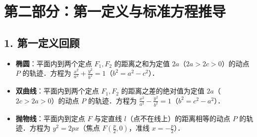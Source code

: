 \documentclass[11pt,a4paper]{ctexart}
\begin{document}
\newpage
\freequestionheader
{\small \qConicDefZeroAngleStem}
\qConicDefZeroAngleOptions
\begin{center}
  \qConicDefZeroAngleFigure
\end{center}

\newpage

\freequestionheader
{\small \qConicDefZeroPyramidStem}
\qConicDefZeroPyramidOptions
\begin{center}
  \qConicDefZeroPyramidFigure
\end{center}

\newpage
\freequestionheader
{\small \qConicDefZeroConeBetaStem}

\qConicDefZeroConeBetaOptions
\begin{center}
  \qConicDefZeroConeBetaFigure
\end{center}

\newpage

\freequestionheader
{\small \qConicDefZeroApolloniusStem}
\qConicDefZeroApolloniusOptions
\begin{center}
  \qConicDefZeroApolloniusFigure
\end{center}

\freequestionheader
{\small \qConicDefZeroCoordinatesMultiStem}
\qConicDefZeroCoordinatesMultiOptions
\begin{center}
  \qConicDefZeroCoordinatesMultiFigure
\end{center}

\newpage

\freequestionheader
{\small \qConicDefZeroCuboidMultiStem}
\qConicDefZeroCuboidMultiOptions
\begin{center}
  \qConicDefZeroCuboidMultiFigure
\end{center}

\newpage

\section{第二部分：第一定义与标准方程推导}

\subsection*{1. 第一定义回顾}
\begin{itemize}[itemsep=0.4em]
  \item \textbf{椭圆}：平面内到两个定点 $F_1, F_2$ 的距离之和为定值 $2a$（$2a > 2c > 0$）的动点 $P$ 的轨迹．方程为 $\frac{x^2}{a^2} + \frac{y^2}{b^2} = 1$（$b^2 = a^2 - c^2$）．
  \item \textbf{双曲线}：平面内到两个定点 $F_1, F_2$ 的距离之差的绝对值为定值 $2a$（$2c > 2a > 0$）的动点 $P$ 的轨迹．方程为 $\frac{x^2}{a^2} - \frac{y^2}{b^2} = 1$（$b^2 = c^2 - a^2$）．
  \item \textbf{抛物线}：平面内到定点 $F$ 与定直线 $l$（点不在线上）的距离相等的动点 $P$ 的轨迹．方程为 $y^2 = 2px$（焦点 $F(\frac{p}{2},0)$，准线 $x = -\frac{p}{2}$）．
\end{itemize}
\end{document}
